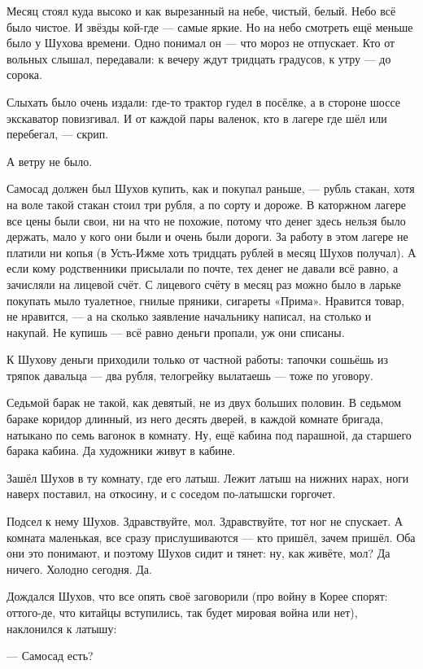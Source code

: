 Месяц стоял куда высоко и как вырезанный на небе, чистый, белый. Небо всё было чистое. И
звёзды кой-где --- самые яркие. Но на небо смотреть ещё меньше было у Шухова времени. Одно
понимал он --- что мороз не отпускает. Кто от вольных слышал, передавали: к вечеру ждут
тридцать градусов, к утру --- до сорока.

Слыхать было очень издали: где-то трактор гудел в посёлке, а в стороне шоссе экскаватор
повизгивал. И от каждой пары валенок, кто в лагере где шёл или перебегал, --- скрип.

А ветру не было.

Самосад должен был Шухов купить, как и покупал раньше, --- рубль стакан, хотя на воле такой
стакан стоил три рубля, а по сорту и дороже. В каторжном лагере все цены были свои, ни на что
не похожие, потому что денег здесь нельзя было держать, мало у кого они были и очень были
дороги. За работу в этом лагере не платили ни копья (в Усть-Ижме хоть тридцать рублей в месяц
Шухов получал). А если кому родственники присылали по почте, тех денег не давали всё равно, а
зачисляли на лицевой счёт. С лицевого счёту в месяц раз можно было в ларьке покупать мыло
туалетное, гнилые пряники, сигареты «Прима». Нравится товар, не нравится, --- а на сколько
заявление начальнику написал, на столько и накупай. Не купишь --- всё равно деньги пропали, уж
они списаны.

К Шухову деньги приходили только от частной работы: тапочки сошьёшь из тряпок давальца ---
два рубля, телогрейку вылатаешь --- тоже по уговору.

Седьмой барак не такой, как девятый, не из двух больших половин. В седьмом бараке коридор
длинный, из него десять дверей, в каждой комнате бригада, натыкано по семь вагонок в комнату.
Ну, ещё кабина под парашной, да старшего барака кабина. Да художники живут в кабине.

Зашёл Шухов в ту комнату, где его латыш. Лежит латыш на нижних нарах, ноги наверх поставил, на
откосину, и с соседом по-латышски горгочет.

Подсел к нему Шухов. Здравствуйте, мол. Здравствуйте, тот ног не спускает. А комната
маленькая, все сразу прислушиваются --- кто пришёл, зачем пришёл. Оба они это понимают, и
поэтому Шухов сидит и тянет: ну, как живёте, мол? Да ничего. Холодно сегодня. Да.

Дождался Шухов, что все опять своё заговорили (про войну в Корее спорят: оттого-де, что
китайцы вступились, так будет мировая война или нет), наклонился к латышу:

--- Самосад есть?

